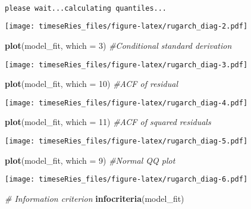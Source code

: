 \documentclass[]{book}
\newenvironment{Shaded}{\begin{snugshade}}{\end{snugshade}}
\newcommand{\KeywordTok}[1]{\textcolor[rgb]{0.13,0.29,0.53}{\textbf{#1}}}
\newcommand{\DataTypeTok}[1]{\textcolor[rgb]{0.13,0.29,0.53}{#1}}
\newcommand{\DecValTok}[1]{\textcolor[rgb]{0.00,0.00,0.81}{#1}}
\newcommand{\CommentTok}[1]{\textcolor[rgb]{0.56,0.35,0.01}{\textit{#1}}}
\newcommand{\NormalTok}[1]{#1}
\begin{document}
\begin{verbatim}

please wait...calculating quantiles...
\end{verbatim}

\texttt{[image: timeseRies\_files/figure-latex/rugarch\_diag-2.pdf]}

\begin{Shaded}
\begin{Highlighting}[]
\KeywordTok{plot}\NormalTok{(model_fit, }\DataTypeTok{which =} \DecValTok{3}\NormalTok{)  }\CommentTok{#Conditional standard derivation}
\end{Highlighting}
\end{Shaded}

\texttt{[image: timeseRies\_files/figure-latex/rugarch\_diag-3.pdf]}

\begin{Shaded}
\begin{Highlighting}[]
\KeywordTok{plot}\NormalTok{(model_fit, }\DataTypeTok{which =} \DecValTok{10}\NormalTok{)  }\CommentTok{#ACF of residual}
\end{Highlighting}
\end{Shaded}

\texttt{[image: timeseRies\_files/figure-latex/rugarch\_diag-4.pdf]}

\begin{Shaded}
\begin{Highlighting}[]
\KeywordTok{plot}\NormalTok{(model_fit, }\DataTypeTok{which =} \DecValTok{11}\NormalTok{)  }\CommentTok{#ACF of squared residuals}
\end{Highlighting}
\end{Shaded}

\texttt{[image: timeseRies\_files/figure-latex/rugarch\_diag-5.pdf]}

\begin{Shaded}
\begin{Highlighting}[]
\KeywordTok{plot}\NormalTok{(model_fit, }\DataTypeTok{which =} \DecValTok{9}\NormalTok{)  }\CommentTok{#Normal QQ plot}
\end{Highlighting}
\end{Shaded}

\texttt{[image: timeseRies\_files/figure-latex/rugarch\_diag-6.pdf]}

\begin{Shaded}
\begin{Highlighting}[]
\CommentTok{# Information criterion}
\KeywordTok{infocriteria}\NormalTok{(model_fit)}
\end{Highlighting}
\end{Shaded}
\end{document}
